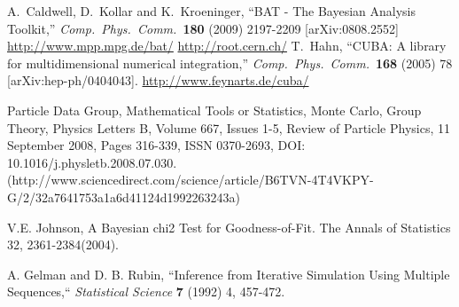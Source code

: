 \documentclass[11pt, a4paper]{article}
\begin{document}

\begin{thebibliography}{99}
  A.~Caldwell, D.~Kollar and K.~Kroeninger, ``BAT - The Bayesian
  Analysis Toolkit,'' \textit{Comp.\ Phys.\ Comm.}\ {\bf 180} (2009) 2197-2209
  [arXiv:0808.2552]
  \url{http://www.mpp.mpg.de/bat/}
%
  \url{http://root.cern.ch/}
%
  T.~Hahn, ``CUBA: A library for multidimensional numerical
  integration,'' \textit{Comp.\ Phys.\ Comm.}\ {\bf 168} (2005) 78
  [arXiv:hep-ph/0404043].
%
  \url{http://www.feynarts.de/cuba/}

Particle Data Group, Mathematical Tools or Statistics, Monte Carlo, Group Theory, Physics Letters B, Volume 667, Issues 1-5, Review of Particle Physics, 11 September 2008, Pages 316-339, ISSN 0370-2693, DOI: 10.1016/j.physletb.2008.07.030.
(http://www.sciencedirect.com/science/article/B6TVN-4T4VKPY-G/2/32a7641753a1a6d41124d1992263243a)

V.E. Johnson,  A Bayesian chi2 Test for Goodness-of-Fit. The Annals of Statistics 32, 2361-2384(2004).

A. Gelman and D. B. Rubin, ``Inference from Iterative Simulation Using Multiple Sequences,`` \emph{Statistical Science}   {\bf 7} (1992) 4,  457-472.


\end{thebibliography}

\end{document}
